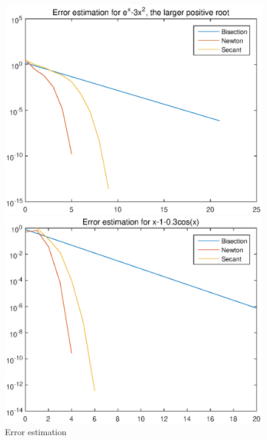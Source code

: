 \begin{figure}
\begin{minipage}{0.45\textwidth}
\includegraphics[width = \textwidth]{resa3.eps}
\end{minipage}
\begin{minipage}{0.45\textwidth}
\includegraphics[width = \textwidth]{resd.eps}
\end{minipage}
\caption{Error estimation}
\label{Figure 1}
\end{figure}


